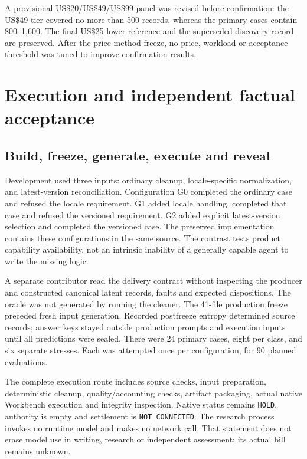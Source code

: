 \documentclass[11pt,letterpaper]{article}
\newcommand{\usd}[1]{US\$#1}
\newcommand{\code}[1]{\texttt{\small #1}}
\begin{document}
A provisional \usd{20}/\usd{49}/\usd{99} panel was revised before confirmation: the \usd{49} tier covered no more than 500 records, whereas the primary cases contain 800--1,600. The final \usd{25} lower reference and the superseded discovery record are preserved. After the price-method freeze, no price, workload or acceptance threshold was tuned to improve confirmation results.

\section{Execution and independent factual acceptance}
\subsection{Build, freeze, generate, execute and reveal}
Development used three inputs: ordinary cleanup, locale-specific normalization, and latest-version reconciliation. Configuration G0 completed the ordinary case and refused the locale requirement. G1 added locale handling, completed that case and refused the versioned requirement. G2 added explicit latest-version selection and completed the versioned case. The preserved implementation contains these configurations in the same source. The contrast tests product capability availability, not an intrinsic inability of a generally capable agent to write the missing logic.

A separate contributor read the delivery contract without inspecting the producer and constructed canonical latent records, faults and expected dispositions. The oracle was not generated by running the cleaner. The 41-file production freeze preceded fresh input generation. Recorded postfreeze entropy determined source records; answer keys stayed outside production prompts and execution inputs until all predictions were sealed. There were 24 primary cases, eight per class, and six separate stresses. Each was attempted once per configuration, for 90 planned evaluations.

The complete execution route includes source checks, input preparation, deterministic cleanup, quality/accounting checks, artifact packaging, actual native Workbench execution and integrity inspection. Native status remains \code{HOLD}, authority is empty and settlement is \code{NOT\_CONNECTED}. The research process invokes no runtime model and makes no network call. That statement does not erase model use in writing, research or independent assessment; its actual bill remains unknown.
\end{document}
